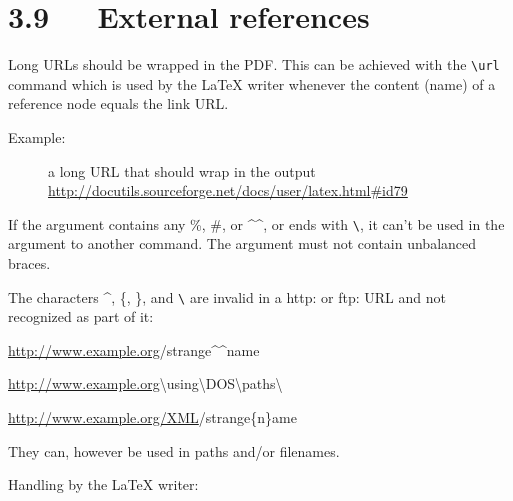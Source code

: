 \documentclass[a4paper]{memoir}
\newenvironment{DUlineblock}[1]{%
    \list{}{\setlength{\partopsep}{\parskip}
            \addtolength{\partopsep}{\baselineskip}
            \setlength{\topsep}{0pt}
            \setlength{\itemsep}{0.15\baselineskip}
            \setlength{\parsep}{0pt}
            \setlength{\leftmargin}{#1}}
    \raggedright
  }
  {\endlist}
\begin{document}
\section{3.9   External references%
  \label{external-references}%
}

Long URLs should be wrapped in the PDF. This can be achieved with the
\texttt{\textbackslash{}url} command which is used by the LaTeX writer whenever the content
(name) of a reference node equals the link URL.

\begin{description}
\item[{Example:}] \leavevmode 
a long URL that should wrap in the output
\url{http://docutils.sourceforge.net/docs/user/latex.html\#id79}

\end{description}

If the argument contains any \textquotedbl{}\%\textquotedbl{}, \textquotedbl{}\#\textquotedbl{}, or \textquotedbl{}\textasciicircum{}\textasciicircum{}\textquotedbl{}, or ends with \texttt{\textbackslash{}}, it can't
be used in the argument to another command. The argument must not contain
unbalanced braces.

The characters \textasciicircum{}, \{, \}, and \texttt{\textbackslash{}} are invalid in a \textquotedbl{}http:\textquotedbl{} or \textquotedbl{}ftp:\textquotedbl{} URL
and not recognized as part of it:

\begin{DUlineblock}{0em}
\item[] \url{http://www.example.org}/strange\textasciicircum{}\textasciicircum{}name
\item[] \url{http://www.example.org}\textbackslash{}using\textbackslash{}DOS\textbackslash{}paths\textbackslash{}
\item[] \url{http://www.example.org/XML}/strange\{n\}ame
\end{DUlineblock}

They can, however be used in paths and/or filenames.

Handling by the LaTeX writer:
\end{document}
